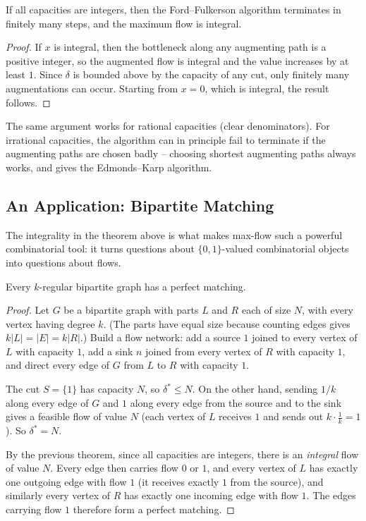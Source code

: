 \documentclass[a4paper]{scrartcl}
\begin{document}
\begin{theorem}[Termination]
    If all capacities are integers, then the Ford--Fulkerson algorithm terminates in finitely many steps, and the maximum flow is integral.
\end{theorem}
\begin{proof}
    If $x$ is integral, then the bottleneck along any augmenting path is a positive integer, so the augmented flow is integral and the value increases by at least $1$. Since $\delta$ is bounded above by the capacity of any cut, only finitely many augmentations can occur. Starting from $x = 0$, which is integral, the result follows.
\end{proof}

The same argument works for rational capacities (clear denominators). For irrational capacities, the algorithm can in principle fail to terminate if the augmenting paths are chosen badly -- choosing shortest augmenting paths always works, and gives the Edmonds--Karp algorithm.

\subsection{An Application: Bipartite Matching}

The integrality in the theorem above is what makes max-flow such a powerful combinatorial tool: it turns questions about $\{0,1\}$-valued combinatorial objects into questions about flows.

\begin{theorem}
    Every $k$-regular bipartite graph has a perfect matching.
\end{theorem}
\begin{proof}
    Let $G$ be a bipartite graph with parts $L$ and $R$ each of size $N$, with every vertex having degree $k$. (The parts have equal size because counting edges gives $k|L| = |E| = k|R|$.) Build a flow network: add a source $1$ joined to every vertex of $L$ with capacity $1$, add a sink $n$ joined from every vertex of $R$ with capacity $1$, and direct every edge of $G$ from $L$ to $R$ with capacity $1$.

    The cut $S = \{1\}$ has capacity $N$, so $\delta^* \leq N$. On the other hand, sending $1/k$ along every edge of $G$ and $1$ along every edge from the source and to the sink gives a feasible flow of value $N$ (each vertex of $L$ receives $1$ and sends out $k \cdot \frac 1k = 1$). So $\delta^* = N$.

    By the previous theorem, since all capacities are integers, there is an \emph{integral} flow of value $N$. Every edge then carries flow $0$ or $1$, and every vertex of $L$ has exactly one outgoing edge with flow $1$ (it receives exactly $1$ from the source), and similarly every vertex of $R$ has exactly one incoming edge with flow $1$. The edges carrying flow $1$ therefore form a perfect matching.
\end{proof}
\end{document}
